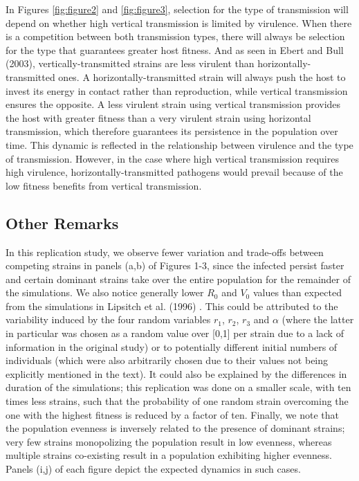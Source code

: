 In Figures \ref{fig:figure2} and \ref{fig:figure3}, selection for the type of
transmission will depend on whether high vertical transmission is limited by
virulence. When there is a competition between both transmission types, there
will always be selection for the type that guarantees greater host fitness. And
as seen in Ebert and Bull (2003), vertically-transmitted strains are less
virulent than horizontally-transmitted ones. A horizontally-transmitted strain
will always push the host to invest its energy in contact rather than
reproduction, while vertical transmission ensures the opposite. A less virulent
strain using vertical transmission provides the host with greater fitness than a
very virulent strain using horizontal transmission, which therefore guarantees
its persistence in the population over time. This dynamic is reflected in the
relationship between virulence and the type of transmission\supercite{Levin:1996}.
However, in the case where high vertical transmission requires high virulence,
horizontally-transmitted pathogens would prevail because of the low fitness
benefits from vertical transmission.

\subsection{Other Remarks}
In this replication study, we observe fewer variation and trade-offs between
competing strains in panels (a,b) of Figures 1-3, since the infected persist
faster and certain dominant strains take over the entire population for the
remainder of the simulations. We also notice generally lower $R_0$ and $V_0$
values than expected from the simulations in Lipsitch et al. (1996)
\supercite{Lipsitch:1996}. This could be attributed to the variability induced
by the four random variables $r_1$, $r_2$, $r_3$ and $\alpha$ (where the latter
in particular was chosen as a random value over [0,1] per strain due to a lack
of information in the original study) or to potentially different initial
numbers of individuals (which were also arbitrarily chosen due to their values
not being explicitly mentioned in the text). It could also be explained by the
differences in duration of the simulations; this replication was done on a
smaller scale, with ten times less strains, such that the probability of one
random strain overcoming the one with the highest fitness is reduced by a
factor of ten. Finally, we note that the population evenness is inversely
related to the presence of dominant strains; very few strains monopolizing the
population result in low evenness, whereas multiple strains co-existing result
in a population exhibiting higher evenness. Panels (i,j) of each figure depict
the expected dynamics in such cases.

